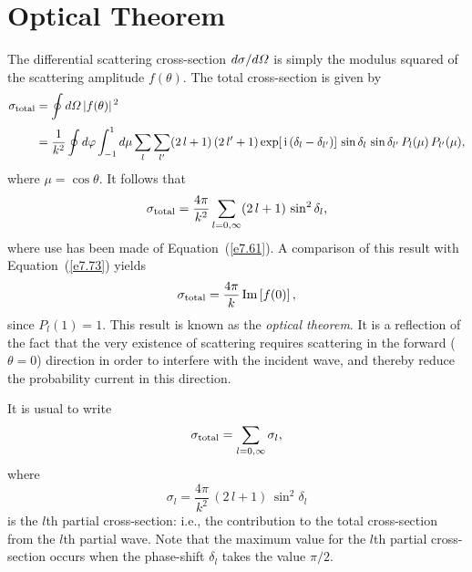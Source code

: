 \section{Optical Theorem}
The differential scattering cross-section $d\sigma/d{\mit\Omega}$ is simply
the modulus squared of the scattering amplitude $f(\theta)$. The
total cross-section is given by
\begin{align}
\sigma_{\rm total}& = \oint d{\mit\Omega}\,|f(\theta)|^{\,2}\nonumber\\[0.5ex]
&= \frac{1}{k^2} \oint d\varphi \int_{-1}^{1} d\mu
\sum_l \sum_{l'} (2\,l+1)\,(2\,l'+1) 
\exp[\,{\rm i}\,(\delta_l-\delta_{l'})]\,  \sin\delta_l \,\sin\delta_{l'}\,
P_l(\mu)\, P_{l'}(\mu),
\end{align}
where $\mu = \cos\theta$. It follows that
\begin{equation}\label{e7.75}
\sigma_{\rm total} = \frac{4\pi}{k^2} \sum_{l=0,\infty} (2\,l+1)\,\sin^2\delta_l,
\end{equation}
where use has been made of Equation~(\ref{e7.61}). A comparison of this result with
Equation~(\ref{e7.73}) yields 
\begin{equation}
\sigma_{\rm total} = \frac{4\pi}{k}\, {\rm Im}\left[f(0)\right],
\end{equation}
since $P_l(1) = 1$. This result is known as the {\em optical theorem}.
It is a reflection of the fact that the very existence of scattering
requires scattering in the forward ($\theta=0$) direction
in order to interfere with the incident wave, and thereby reduce the
probability current in this direction.

It is usual to write
\begin{equation}
\sigma_{\rm total} = \sum_{l=0,\infty} \sigma_l,
\end{equation}
where 
\begin{equation}\label{e7.78}
\sigma_l = \frac{4\pi}{k^2}\, (2\,l+1)\, \sin^2\delta_l
\end{equation}
is the $l$th partial cross-section: {\rm  i.e.}, the contribution to the
total cross-section from the $l$th partial wave. Note that the maximum 
value for the $l$th partial cross-section occurs when the phase-shift  $\delta_l$ takes the value $\pi/2$.

